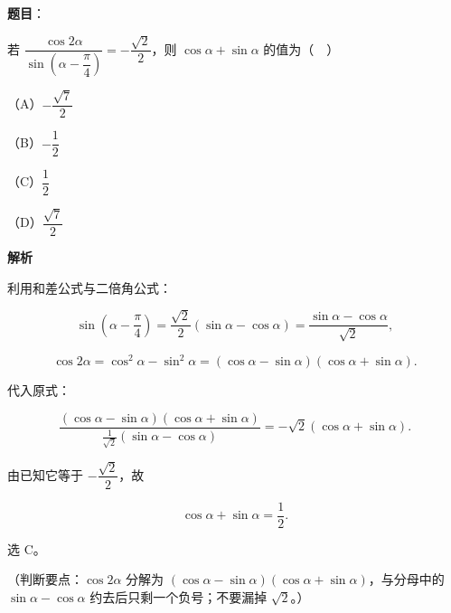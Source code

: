 \begin{answer}

\textbf{题目}：

若 $\dfrac{\cos2\alpha}{\sin\left(\alpha-\dfrac{\pi}{4}\right)}=-\dfrac{\sqrt2}{2}$，则 $\cos\alpha+\sin\alpha$ 的值为（　）

（A）$-\dfrac{\sqrt7}{2}$

（B）$-\dfrac12$

（C）$\dfrac12$

（D）$\dfrac{\sqrt7}{2}$

\textbf{解析}

利用和差公式与二倍角公式：

\nopagebreak[4]
\[\sin\left(\alpha-\frac{\pi}{4}\right)=\frac{\sqrt2}{2}(\sin\alpha-\cos\alpha)=\frac{\sin\alpha-\cos\alpha}{\sqrt2},\]

\nopagebreak[4]
\[\cos2\alpha=\cos^2\alpha-\sin^2\alpha=(\cos\alpha-\sin\alpha)(\cos\alpha+\sin\alpha).\]

代入原式：

\nopagebreak[4]
\[\frac{(\cos\alpha-\sin\alpha)(\cos\alpha+\sin\alpha)}{\frac{1}{\sqrt2}(\sin\alpha-\cos\alpha)}=-\sqrt2(\cos\alpha+\sin\alpha).\]

由已知它等于 $-\dfrac{\sqrt2}{2}$，故

\nopagebreak[4]
\[\cos\alpha+\sin\alpha=\frac12.\]

选 C。

（判断要点：$\cos2\alpha$ 分解为 $(\cos\alpha-\sin\alpha)(\cos\alpha+\sin\alpha)$，与分母中的 $\sin\alpha-\cos\alpha$ 约去后只剩一个负号；不要漏掉 $\sqrt2$。）


\end{answer}
